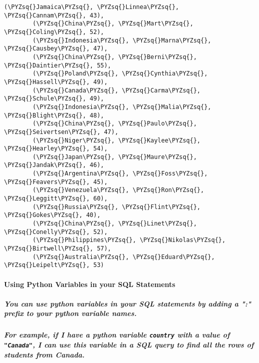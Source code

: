 \documentclass[11pt]{article}
\def\PYZsq{\textquotesingle}%
\def\PYZsq{\char`\'}
\begin{document}
\begin{Verbatim}[commandchars=\\\{\}]
        (\PYZsq{}Jamaica\PYZsq{}, \PYZsq{}Linnea\PYZsq{}, \PYZsq{}Cannam\PYZsq{}, 43),
        (\PYZsq{}China\PYZsq{}, \PYZsq{}Mart\PYZsq{}, \PYZsq{}Coling\PYZsq{}, 52),
        (\PYZsq{}Indonesia\PYZsq{}, \PYZsq{}Marna\PYZsq{}, \PYZsq{}Causbey\PYZsq{}, 47),
        (\PYZsq{}China\PYZsq{}, \PYZsq{}Berni\PYZsq{}, \PYZsq{}Daintier\PYZsq{}, 55),
        (\PYZsq{}Poland\PYZsq{}, \PYZsq{}Cynthia\PYZsq{}, \PYZsq{}Hassell\PYZsq{}, 49),
        (\PYZsq{}Canada\PYZsq{}, \PYZsq{}Carma\PYZsq{}, \PYZsq{}Schule\PYZsq{}, 49),
        (\PYZsq{}Indonesia\PYZsq{}, \PYZsq{}Malia\PYZsq{}, \PYZsq{}Blight\PYZsq{}, 48),
        (\PYZsq{}China\PYZsq{}, \PYZsq{}Paulo\PYZsq{}, \PYZsq{}Seivertsen\PYZsq{}, 47),
        (\PYZsq{}Niger\PYZsq{}, \PYZsq{}Kaylee\PYZsq{}, \PYZsq{}Hearley\PYZsq{}, 54),
        (\PYZsq{}Japan\PYZsq{}, \PYZsq{}Maure\PYZsq{}, \PYZsq{}Jandak\PYZsq{}, 46),
        (\PYZsq{}Argentina\PYZsq{}, \PYZsq{}Foss\PYZsq{}, \PYZsq{}Feavers\PYZsq{}, 45),
        (\PYZsq{}Venezuela\PYZsq{}, \PYZsq{}Ron\PYZsq{}, \PYZsq{}Leggitt\PYZsq{}, 60),
        (\PYZsq{}Russia\PYZsq{}, \PYZsq{}Flint\PYZsq{}, \PYZsq{}Gokes\PYZsq{}, 40),
        (\PYZsq{}China\PYZsq{}, \PYZsq{}Linet\PYZsq{}, \PYZsq{}Conelly\PYZsq{}, 52),
        (\PYZsq{}Philippines\PYZsq{}, \PYZsq{}Nikolas\PYZsq{}, \PYZsq{}Birtwell\PYZsq{}, 57),
        (\PYZsq{}Australia\PYZsq{}, \PYZsq{}Eduard\PYZsq{}, \PYZsq{}Leipelt\PYZsq{}, 53)
\end{Verbatim}


    \paragraph{Using Python Variables in your SQL
Statements}\label{using-python-variables-in-your-sql-statements}

\subparagraph{You can use python variables in your SQL statements by
adding a ":" prefix to your python variable
names.}\label{you-can-use-python-variables-in-your-sql-statements-by-adding-a-prefix-to-your-python-variable-names.}

\subparagraph{\texorpdfstring{For example, if I have a python variable
\texttt{country} with a value of \texttt{"Canada"}, I can use this
variable in a SQL query to find all the rows of students from
Canada.}{For example, if I have a python variable country with a value of "Canada", I can use this variable in a SQL query to find all the rows of students from Canada.}}\label{for-example-if-i-have-a-python-variable-country-with-a-value-of-canada-i-can-use-this-variable-in-a-sql-query-to-find-all-the-rows-of-students-from-canada.}
\end{document}
